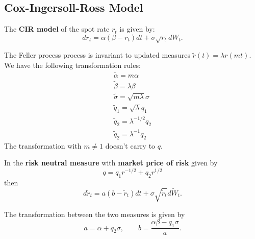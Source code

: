 \subsection{Cox-Ingersoll-Ross Model}
\begin{outline}
  \1 The \textbf{CIR model} of the spot rate $r_t$ is given by:
  \begin{equation*}
    dr_t = \alpha(\beta - r_t)dt + \sigma\sqrt{r_t}dW_t.
  \end{equation*}

  \1 The Feller process process is invariant to updated measures
  $\tilde r(t) = \lambda r(mt)$. We have the following transformation rules:
  \begin{gather*}
    \tilde\alpha = m\alpha\\
    \tilde\beta = \lambda\beta\\
    \tilde\sigma = \sqrt{m\lambda}\sigma\\
    \tilde q_1 = \sqrt{\lambda}q_1\\
    \tilde q_2 = \lambda^{-1/2}q_2\\
    \tilde q_2 = \lambda^{-1}q_2
  \end{gather*}
  The transformation with $m\neq1$ doesn't carry to $q$.

  \1 In the \textbf{risk neutral measure} with \textbf{market price of risk} given by
  \begin{equation*}
    q = q_1 r^{-1/2} + q_2 r^{1/2}
  \end{equation*}
  then 
  \begin{equation*}
    d\tilde r_t = a(b-\tilde r_t)dt + \sigma\sqrt{\tilde r_t}d\tilde W_t.
  \end{equation*}

  \1 The transformation between the two measures is given by
  \begin{equation*}
    a = \alpha + q_2\sigma,\qquad b=\frac{\alpha\beta - q_1\sigma}{a}.
  \end{equation*}


\end{outline}
